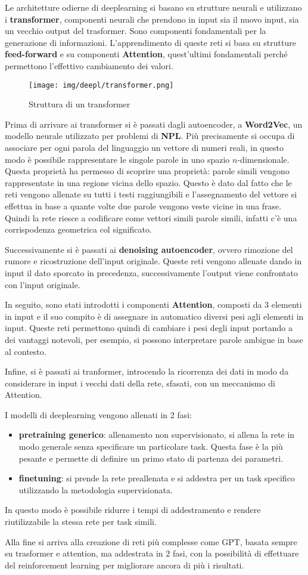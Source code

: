 Le architetture odierne di deeplearning si basano su strutture neurali e utilizzano i
\textbf{transformer}, componenti neurali che prendono in input sia il nuovo input,
sia un vecchio output del trasformer. Sono componenti fondamentali per la generazione
di informazioni. L'apprendimento di queste reti si basa su strutture \textbf{feed-forward}
e su componenti \textbf{Attention}, quest'ultimi fondamentali perché permettono
l'effettivo cambiamento dei valori.
\begin{figure}[!ht]
    \centering
    \texttt{[image: img/deepl/transformer.png]}
    \caption{Struttura di un transformer}
    \label{fig:transformer}
\end{figure}
Prima di arrivare ai transformer si è passati dagli autoencoder, a \textbf{Word2Vec},
un modello neurale utilizzato per problemi di \textbf{NPL}. Più precisamente si occupa
di associare per ogni parola del linguaggio un vettore di numeri reali, in questo
modo è possibile rappresentare le singole parole in uno spazio $n$-dimensionale.
Questa proprietà ha permesso di scoprire una proprietà: parole simili vengono
rappresentate in una regione vicina dello spazio. Questo è dato dal fatto che
le reti vengono allenate su tutti i testi raggiungibili e l'assegnamento del vettore
si effettua in base a quante volte due parole vengono veste vicine in una frase.
Quindi la rete riesce a codificare come vettori simili parole simili, infatti c'è
una corrispodenza geometrica col significato.

Successivamente si è passati ai \textbf{denoising autoencoder}, ovvero rimozione
del rumore e ricostruzione dell'input originale. Queste reti vengono allenate dando
in input il dato sporcato in precedenza, successivamente l'output viene confrontato
con l'input originale.

In seguito, sono stati introdotti i componenti \textbf{Attention}, composti da 3
elementi in input e il suo compito è di assegnare in automatico diversi pesi
agli elementi in input. Queste reti permettono quindi di cambiare i pesi degli input
portando a dei vantaggi notevoli, per esempio, si possono interpretare parole ambigue
in base al contesto.

Infine, si è passati ai tranformer, introcendo la ricorrenza dei dati in modo da
considerare in input i vecchi dati della rete, sfasati, con un meccanismo di
Attention.

I modelli di deeplearning vengono allenati in 2 fasi:
\begin{itemize}
    \item \textbf{pretraining generico}: allenamento non supervisionato, si allena
          la rete in modo generale senza specificare un particolare task. Questa
          fase è la più pesante e permette di definire un primo stato di partenza
          dei parametri.
    \item \textbf{finetuning}: si prende la rete preallenata e si addestra per un
          task specifico utilizzando la metodologia supervisionata.
\end{itemize}
In questo modo è possibile ridurre i tempi di addestramento e rendere riutilizzabile
la stessa rete per task simili.

Alla fine si arriva alla creazione di reti più complesse come GPT, basata sempre
su trasformer e attention, ma addestrata in 2 fasi, con la possibilità di effettuare
del reinforcement learning per migliorare ancora di più i risultati.
